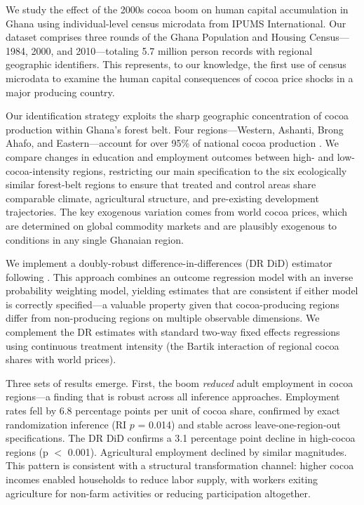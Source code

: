 \documentclass[12pt]{article}
\begin{document}
We study the effect of the 2000s cocoa boom on human capital accumulation in Ghana using individual-level census microdata from IPUMS International. Our dataset comprises three rounds of the Ghana Population and Housing Census---1984, 2000, and 2010---totaling 5.7 million person records with regional geographic identifiers. This represents, to our knowledge, the first use of census microdata to examine the human capital consequences of cocoa price shocks in a major producing country.

Our identification strategy exploits the sharp geographic concentration of cocoa production within Ghana's forest belt. Four regions---Western, Ashanti, Brong Ahafo, and Eastern---account for over 95\% of national cocoa production \citep{vigneri2005}. We compare changes in education and employment outcomes between high- and low-cocoa-intensity regions, restricting our main specification to the six ecologically similar forest-belt regions to ensure that treated and control areas share comparable climate, agricultural structure, and pre-existing development trajectories. The key exogenous variation comes from world cocoa prices, which are determined on global commodity markets and are plausibly exogenous to conditions in any single Ghanaian region.

We implement a doubly-robust difference-in-differences (DR DiD) estimator following \citet{santanna2020}. This approach combines an outcome regression model with an inverse probability weighting model, yielding estimates that are consistent if either model is correctly specified---a valuable property given that cocoa-producing regions differ from non-producing regions on multiple observable dimensions. We complement the DR estimates with standard two-way fixed effects regressions using continuous treatment intensity (the Bartik interaction of regional cocoa shares with world prices).

Three sets of results emerge. First, the boom \textit{reduced} adult employment in cocoa regions---a finding that is robust across all inference approaches. Employment rates fell by 6.8 percentage points per unit of cocoa share, confirmed by exact randomization inference (RI $p$ = 0.014) and stable across leave-one-region-out specifications. The DR DiD confirms a 3.1 percentage point decline in high-cocoa regions (p $<$ 0.001). Agricultural employment declined by similar magnitudes. This pattern is consistent with a structural transformation channel: higher cocoa incomes enabled households to reduce labor supply, with workers exiting agriculture for non-farm activities or reducing participation altogether.
\end{document}
